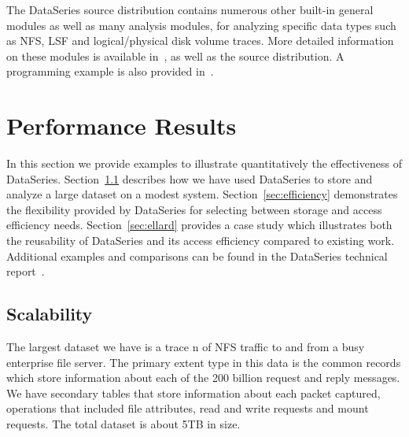 \documentclass{acm_proc_article-sp}
\begin{document}
The DataSeries source distribution contains numerous other built-in 
general modules as well as many analysis modules, for analyzing
specific data types such as NFS, LSF and logical/physical disk volume
traces.  More detailed information on these modules is available 
in~\cite{DSTechnicalReportSnapshot}, as well as the source distribution.
A programming example is also provided in~\cite{DSTechnicalReportSnapshot}.

\section{Performance Results}\label{sec:results}


In this section we provide examples to illustrate quantitatively the 
effectiveness of DataSeries.  
Section~\ref{sec:scale} describes how we have used DataSeries to store 
and analyze a large dataset on a modest system.
Section~\ref{sec:efficiency} demonstrates the flexibility provided
by DataSeries for selecting between storage and access efficiency needs.
Section~\ref{sec:ellard} provides a case study which illustrates
both the reusability of DataSeries and its access efficiency compared
to existing work.
Additional examples and comparisons can be found in the
DataSeries technical report~\cite{DSTechnicalReportSnapshot}.

\subsection{Scalability}\label{sec:scale}

The largest dataset we have is a trace n of NFS traffic to and from a 
busy enterprise file server.
The primary extent type 
in this data is the common records which store information about each
of the 200 billion request and reply messages. We have secondary tables that
store information about each packet captured, operations that included
file attributes, read and write requests and mount requests.  The total dataset
is about 5TB in size.
\end{document}
